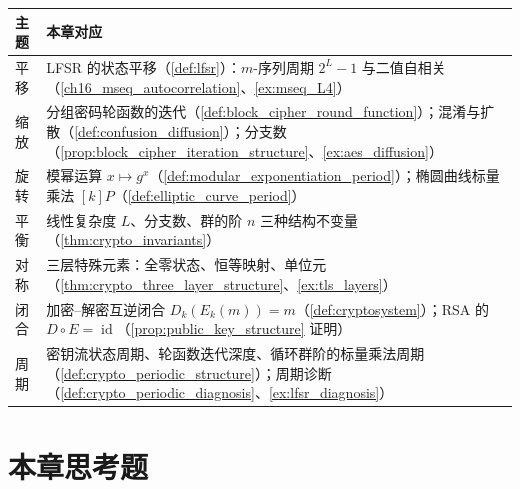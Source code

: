 \begin{center}
\renewcommand{\arraystretch}{1.3}
\begin{tabular}{>{\centering\arraybackslash}p{2.2cm}>{\centering\arraybackslash}p{10.5cm}}
\toprule
主题 & 本章对应 \\
\midrule
平移 & LFSR 的状态平移（\cref{def:lfsr}）：\(m\)-序列周期 \(2^L-1\) 与二值自相关（\cref{ch16_mseq_autocorrelation}、\cref{ex:mseq_L4}） \\
缩放 & 分组密码轮函数的迭代（\cref{def:block_cipher_round_function}）；混淆与扩散（\cref{def:confusion_diffusion}）；分支数（\cref{prop:block_cipher_iteration_structure}、\cref{ex:aes_diffusion}） \\
旋转 & 模幂运算 \(x\mapsto g^x\)（\cref{def:modular_exponentiation_period}）；椭圆曲线标量乘法 \([k]P\)（\cref{def:elliptic_curve_period}） \\
平衡 & 线性复杂度 \(L\)、分支数、群的阶 \(n\) 三种结构不变量（\cref{thm:crypto_invariants}） \\
对称 & 三层特殊元素：全零状态、恒等映射、单位元（\cref{thm:crypto_three_layer_structure}、\cref{ex:tls_layers}） \\
闭合 & 加密--解密互逆闭合 \(D_k(E_k(m))=m\)（\cref{def:cryptosystem}）；RSA 的 \(D\circ E=\operatorname{id}\)（\cref{prop:public_key_structure} 证明） \\
周期 & 密钥流状态周期、轮函数迭代深度、循环群阶的标量乘法周期（\cref{def:crypto_periodic_structure}）；周期诊断（\cref{def:crypto_periodic_diagnosis}、\cref{ex:lfsr_diagnosis}） \\
\bottomrule
\end{tabular}
\end{center}

\section*{本章思考题}

